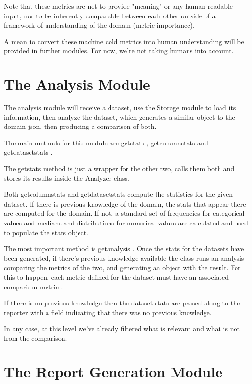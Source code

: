 Note that these metrics are not to provide "meaning" or any human-readable input, nor to be
inherently comparable between each other outside of a framework of understanding of the domain
(metric importance).

A mean to convert these machine cold metrics into human understanding will be provided in further 
modules. For now, we're not taking humans into account.

\section{The Analysis Module}
\label{cap2:sec:analysis}

The analysis module will receive a dataset, use the Storage module to load its information, then analyze the dataset, which generates a similar object to the domain json, then producing a comparison of both.

The main methods for this module are  getstats ,  getcolumnstats  and  getdatasetstats .

The  getstats  method is just a wrapper for the other two, calls them both and stores its results inside the Analyzer class.

Both  getcolumnstats  and  getdatasetstats  compute the statistics for the given dataset. If there is previous knowledge of the domain, the stats that appear there are computed for the domain. If not, a standard set of frequencies for categorical values and medians and distributions for numerical values are calculated and used to populate the stats object.

The most important method is  getanalysis . Once the stats for the datasets have been generated, if there's previous knowledge available the class runs an analysis comparing the metrics of the two, and generating an object with the result. For this to happen, each metric defined for the dataset must have an associated  comparison metric .

If there is no previous knowledge then the dataset stats are passed along to the reporter with a field indicating that there was no previous knowledge.

In any case, at this level we've already filtered what is relevant and what is not from the comparison.

\section{The Report Generation Module}
\label{cap2:sec:reporter}

